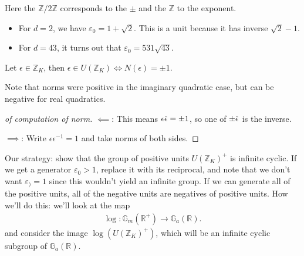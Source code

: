 \begin{remark}

Here the \({\mathbb{Z}}/2{\mathbb{Z}}\) corresponds to the \(\pm\) and
the \({\mathbb{Z}}\) to the exponent.

\end{remark}

\begin{example}

\envlist

\begin{itemize}
\item
  For \(d=2\), we have \(\varepsilon_0 = 1 + \sqrt{2}\). This is a unit
  because it has inverse \(\sqrt{2} -1\).
\item
  For \(d=43\), it turns out that \(\varepsilon_0 = 531 \sqrt{43}\).
\end{itemize}

\end{example}

\begin{lemma}

Let \(\epsilon\in {\mathbb{Z}}_K\), then
\(\epsilon \in U({\mathbb{Z}}_K) \iff N( \epsilon) = \pm 1\).

\end{lemma}

\begin{remark}

Note that norms were positive in the imaginary quadratic case, but can
be negative for real quadratics.

\end{remark}

\begin{proof}[of computation of norm]

\(\impliedby\): This means
\(\epsilon \mkern 1.5mu\overline{\mkern-1.5mu \epsilon \mkern-1.5mu}\mkern 1.5mu = \pm 1\),
so one of
\(\pm \mkern 1.5mu\overline{\mkern-1.5mu\epsilon\mkern-1.5mu}\mkern 1.5mu\)
is the inverse.

\(\implies\): Write \(\epsilon \epsilon ^{-1} = 1\) and take norms of
both sides.

\end{proof}

\begin{remark}

Our strategy: show that the group of positive units
\(U({\mathbb{Z}}_K)^+\) is infinite cyclic. If we get a generator
\(\varepsilon_0 > 1\), replace it with its reciprocal, and note that we
don't want \(\varepsilon_) = 1\) since this wouldn't yield an infinite
group. If we can generate all of the positive units, all of the negative
units are negatives of positive units. How we'll do this: we'll look at
the map
\begin{align*}
\log: {\mathbb{G}}_m({\mathbb{R}}^+) \xrightarrow{} {\mathbb{G}}_a({\mathbb{R}})
.\end{align*}
and consider the image \(\log( U( {\mathbb{Z}}_K)^+)\), which will be an
infinite cyclic subgroup of \({\mathbb{G}}_a({\mathbb{R}})\).

\end{remark}

